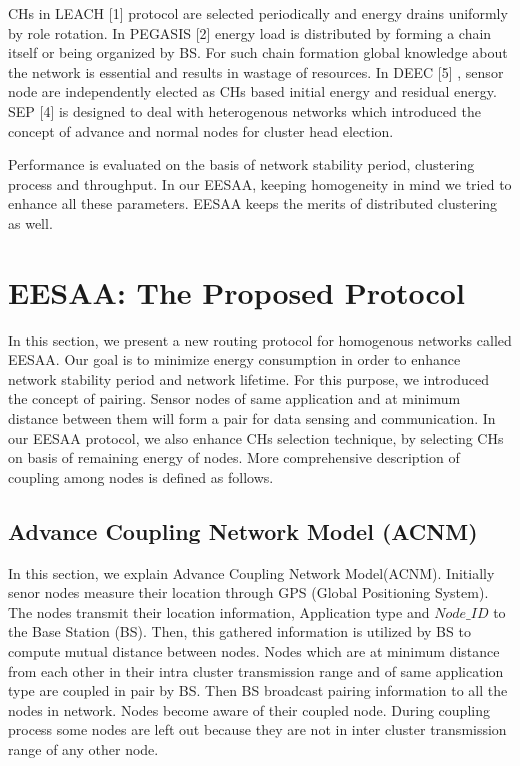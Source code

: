 \documentclass[journal]{IEEEtran}
\begin{document}
CHs in LEACH [1] protocol are selected periodically and energy drains uniformly by role rotation. In PEGASIS [2] energy load is distributed by forming a chain itself or being organized by BS. For such chain formation global knowledge about the network is essential and results in wastage of resources. In DEEC [5] , sensor node are independently elected as CHs based initial energy and residual energy. SEP [4] is designed to deal with heterogenous networks which introduced the concept of advance and normal nodes for cluster head election.

Performance is evaluated on the basis of network stability period, clustering process and throughput. In our EESAA, keeping homogeneity in mind we tried to enhance all these parameters. EESAA keeps the merits of distributed clustering as well.

\section{EESAA: The Proposed Protocol}
In this section, we present a new routing protocol for homogenous networks called EESAA. Our goal is to minimize energy consumption in order to enhance network stability period and network lifetime. For this purpose, we introduced the concept of pairing. Sensor nodes of same application and at minimum distance between them will form a pair for data sensing and communication. In our EESAA protocol, we also enhance CHs selection technique, by selecting CHs on basis of remaining energy of nodes. More comprehensive description of coupling among nodes is defined as follows.

\subsection{Advance Coupling Network Model (ACNM)}
In this section, we explain Advance Coupling Network Model(ACNM). Initially senor nodes measure their location through GPS (Global Positioning System). The nodes transmit their location information, Application type and $Node \_ ID$ to the Base Station (BS). Then, this gathered information is utilized by BS to compute mutual distance between nodes. Nodes which are at minimum distance from each other in their intra cluster transmission range and of same application type are coupled in pair by BS. Then BS broadcast pairing information to all the nodes in network. Nodes become aware of their coupled node. During coupling process some nodes are left out because they are not in inter cluster transmission range of any other node.
\end{document}
